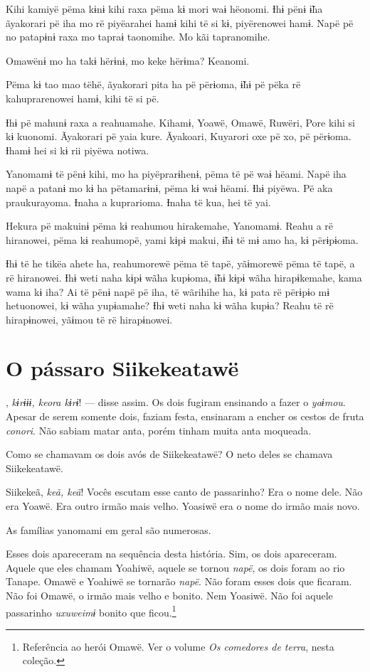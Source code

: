 Kihi kamiyë pëma kɨnɨ kihi raxa pëma kɨ mori waɨ hëonomi. Ɨhɨ pënɨ ɨ̃ha
ãyakorari pë iha mo rë piyëarahei hamɨ kihi të si kɨ, piyërenowei hamɨ.
Napë pë no patapɨnɨ raxa mo tapraɨ taonomihe. Mo kãi tapranomihe. 

Omawënɨ mo ha takɨ hërɨnɨ, mo keke hërɨma? Keanomi. 

Pëma kɨ tao mao tëhë, ãyakorari pita ha pë përɨoma, ɨ̃hɨ pë pëka rë
kahuprarenowei hamɨ, kihi të si pë. 

Ɨhɨ pë mahunɨ raxa a reahuamahe. Kihamɨ, Yoawë, Omawë, Ruwëri, Pore kihi
si kɨ kuonomi. Ãyakorari pë yaia kure. Ãyakoari, Kuyarori oxe pë xo, pë
përɨoma. Ɨhamɨ hei si kɨ rii piyëwa notiwa.

Yanomamɨ të pënɨ kihi, mo ha piyëprarɨhenɨ, pëma të pë waɨ hëami. Napë
iha napë a patanɨ mo kɨ ha pëtamarɨnɨ, pëma kɨ waɨ hëami. Ɨhɨ piyëwa. Pë
aka praukurayoma. Ɨnaha a kuprarioma. Ɨnaha të kua, hei të yai. 

Hekura pë makuinɨ pëma kɨ reahumou hirakemahe, Yanomamɨ. Reahu a rë
hiranowei, pëma kɨ reahumopë, yami kɨpɨ makui, ɨ̃hɨ të mɨ amo ha, kɨ
përɨpɨoma. 

Ɨhɨ të he tikëa ahete ha, reahumorewë pëma të tapë, yãɨmorewë pëma të
tapë, a rë hiranowei. Ɨhɨ weti naha kɨpɨ wãha kupɨoma, ɨ̃hɨ kɨpɨ wãha
hirapɨkemahe, kama wama kɨ iha? Ai të pënɨ napë pë iha, të wãrihihe ha,
kɨ pata rë përɨpɨo mɨ hetuonowei, kɨ wãha yupɨamahe? Ɨhɨ weti naha kɨ
wãha kupɨa? Reahu të rë hirapɨnowei, yãɨmou të rë hirapɨnowei. 

\chapter{O pássaro Siikekeatawë}
 
, \textit{kɨrɨɨɨ, keora kɨrɨ}! --- disse assim. Os dois fugiram ensinando a fazer o \textit{yaɨmou}. Apesar de serem somente dois, faziam festa, ensinaram a encher os cestos de fruta
\textit{conori}. Não sabiam matar anta, porém tinham muita anta moqueada. 

Como se chamavam os dois avós de Siikekeatawë? O neto deles se chamava
Siikekeatawë. 

Siikekeã, \textit{keã, keã}! Vocês escutam esse canto de passarinho? Era o
nome dele. Não era Yoawë. Era outro irmão mais velho. Yoasiwë era o nome
do irmão mais novo. 

As famílias yanomami em geral são numerosas. 

Esses dois apareceram na sequência desta história. Sim, os dois
apareceram. Aquele que eles chamam Yoahiwë, aquele se
tornou \textit{napë}, os dois foram ao rio Tanape. Omawë e Yoahiwë se
tornarão \textit{napë}. Não foram esses dois que ficaram. Não foi Omawë, o
irmão mais velho e bonito. Nem Yoasiwë. Não foi aquele
passarinho \textit{uxuweimɨ} bonito que ficou.\footnote{Referência ao herói Omawë. 
Ver o volume \textit{Os comedores de terra}, nesta coleção.} 

